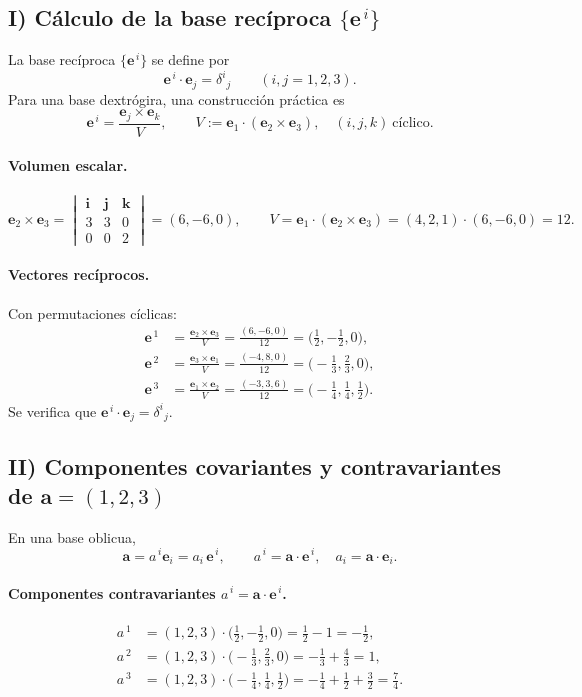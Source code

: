 \documentclass[12pt]{article}
\newcommand{\e}{\mathbf e}   %
\begin{document}
\subsection*{I) Cálculo de la base recíproca $\{\e^{\,i}\}$}

La base recíproca $\{\e^{\,i}\}$ se define por
\[
\e^{\,i}\!\cdot \e_j=\delta^i{}_j\qquad (i,j=1,2,3).
\]
Para una base dextrógira, una construcción práctica es
\[
\boxed{\quad 
\e^{\,i}=\dfrac{\e_j\times \e_k}{V},
\qquad 
V:=\e_1\cdot(\e_2\times \e_3),\quad (i,j,k)\ \text{cíclico}.
\quad}
\]

\paragraph{Volumen escalar.}
\[
\e_2\times \e_3=
\begin{vmatrix}
\mathbf i& \mathbf j& \mathbf k\\
3&3&0\\
0&0&2
\end{vmatrix}=(6,-6,0),
\qquad
V=\e_1\cdot(\e_2\times \e_3)=(4,2,1)\cdot(6,-6,0)=12.
\]

\paragraph{Vectores recíprocos.}
Con permutaciones cíclicas:
\[
\begin{aligned}
\e^{\,1}&=\frac{\e_2\times \e_3}{V}
=\frac{(6,-6,0)}{12}=\Big(\tfrac12,-\tfrac12,0\Big),\\[2mm]
\e^{\,2}&=\frac{\e_3\times \e_1}{V}
=\frac{(-4,8,0)}{12}=\Big(-\tfrac13,\tfrac23,0\Big),\\[2mm]
\e^{\,3}&=\frac{\e_1\times \e_2}{V}
=\frac{(-3,3,6)}{12}=\Big(-\tfrac14,\tfrac14,\tfrac12\Big).
\end{aligned}
\]
Se verifica que $\e^{\,i}\!\cdot \e_j=\delta^i{}_j$.

\subsection*{II) Componentes covariantes y contravariantes de $\mathbf a=(1,2,3)$}

En una base oblicua,
\[
\mathbf a=a^{\,i}\e_i=a_i\,\e^{\,i},
\qquad
a^{\,i}=\mathbf a\cdot \e^{\,i},\quad
a_i=\mathbf a\cdot \e_i .
\]

\paragraph{Componentes contravariantes $a^{\,i}=\mathbf a\cdot \e^{\,i}$.}
\[
\begin{aligned}
a^{\,1}&=(1,2,3)\cdot\Big(\tfrac12,-\tfrac12,0\Big)=\tfrac12-1=-\tfrac12,\\
a^{\,2}&=(1,2,3)\cdot\Big(-\tfrac13,\tfrac23,0\Big)=-\tfrac13+\tfrac43=1,\\
a^{\,3}&=(1,2,3)\cdot\Big(-\tfrac14,\tfrac14,\tfrac12\Big)=-\tfrac14+\tfrac12+\tfrac32=\tfrac74.
\end{aligned}
\]
\end{document}
